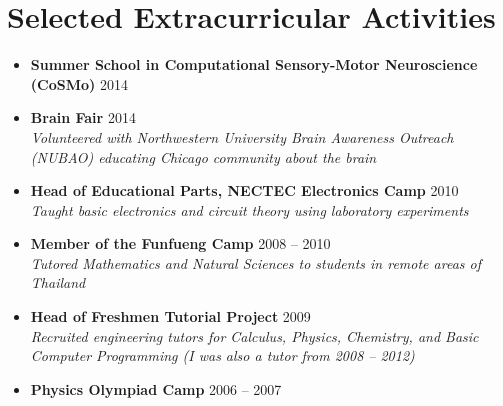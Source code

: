 \section{\sc Selected Extracurricular Activities}

\begin{itemize}[leftmargin=0cm, label={}]
\item {\bf Summer School in Computational Sensory-Motor Neuroscience (CoSMo)} \hfill 2014

\item{\bf Brain Fair} \hfill 2014\\
{\em Volunteered with Northwestern University Brain Awareness Outreach (NUBAO) educating Chicago community about the brain}

\item {\bf Head of Educational Parts, NECTEC Electronics Camp} \hfill 2010 \\
{\em Taught basic electronics and circuit theory using laboratory experiments}

\item {\bf Member of the Funfueng Camp}	\hfill 2008 -- 2010 \\
{\em Tutored Mathematics and Natural Sciences to students in remote areas of Thailand}

\item {\bf Head of Freshmen Tutorial Project } \hfill 2009 \\
{\em Recruited engineering tutors for Calculus, Physics, Chemistry, and Basic Computer Programming (I was also a tutor from 2008 -- 2012)}

\item {\bf Physics Olympiad Camp} \hfill 2006 -- 2007

\end{itemize}
